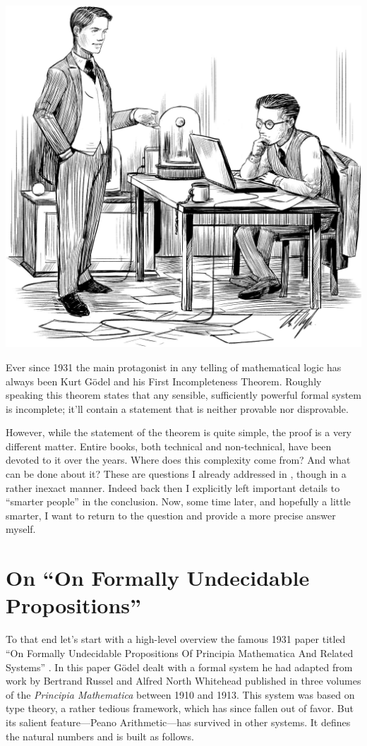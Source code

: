 \documentclass{article}
\theoremstyle{customstyle}
\begin{document}
\begin{center}
\includegraphics[scale=0.115]{cover}
\end{center}

Ever since 1931 the main protagonist in any telling of mathematical logic has always been Kurt Gödel and his First Incompleteness Theorem. Roughly speaking this theorem states that any sensible, sufficiently powerful formal system is incomplete; it'll contain a statement that is neither provable nor disprovable.

However, while the statement of the theorem is quite simple, the proof is a very different matter. Entire books, both technical and non-technical, have been devoted to it over the years. Where does this complexity come from? And what can be done about it? These are questions I already addressed in \cite{oberhoff}, though in a rather inexact manner. Indeed back then I explicitly left important details to ``smarter people'' in the conclusion. Now, some time later, and hopefully a little smarter, I want to return to the question and provide a more precise answer myself.

\section{On ``On Formally Undecidable Propositions''}

To that end let's start with a high-level overview the famous 1931 paper titled ``On Formally Undecidable Propositions Of Principia Mathematica And Related Systems'' \cite{goedel}. In this paper Gödel dealt with a formal system he had adapted from work by Bertrand Russel and Alfred North Whitehead published in three volumes of the \emph{Principia Mathematica} between 1910 and 1913. This system was based on type theory, a rather tedious framework, which has since fallen out of favor. But its salient feature---Peano Arithmetic---has survived in other systems. It defines the natural numbers and is built as follows.
\end{document}
